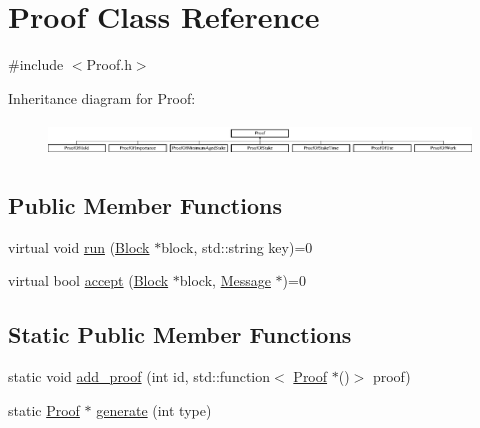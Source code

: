 \hypertarget{classProof}{}\section{Proof Class Reference}
\label{classProof}


{\ttfamily \#include $<$Proof.\+h$>$}

Inheritance diagram for Proof\+:\begin{figure}[H]
\begin{center}
\leavevmode
\includegraphics[height=0.914286cm]{classProof}
\end{center}
\end{figure}
\subsection*{Public Member Functions}
\begin{DoxyCompactItemize}
\item 
virtual void \mbox{\hyperlink{classProof_a8a43fcb7c997da54d627e0f257adb86f}{run}} (\mbox{\hyperlink{classBlock}{Block}} $\ast$block, std\+::string key)=0
\item 
virtual bool \mbox{\hyperlink{classProof_ad52fee058ea617a186133cb6a008fe6e}{accept}} (\mbox{\hyperlink{classBlock}{Block}} $\ast$block, \mbox{\hyperlink{classMessage}{Message}} $\ast$)=0
\end{DoxyCompactItemize}
\subsection*{Static Public Member Functions}
\begin{DoxyCompactItemize}
\item 
static void \mbox{\hyperlink{classProof_a71874539fdbcc93c15594b889c95225b}{add\+\_\+proof}} (int id, std\+::function$<$ \mbox{\hyperlink{classProof}{Proof}} $\ast$()$>$ proof)
\item 
static \mbox{\hyperlink{classProof}{Proof}} $\ast$ \mbox{\hyperlink{classProof_a267f0f4587babb59884b5f280e2d54c8}{generate}} (int type)
\end{DoxyCompactItemize}
